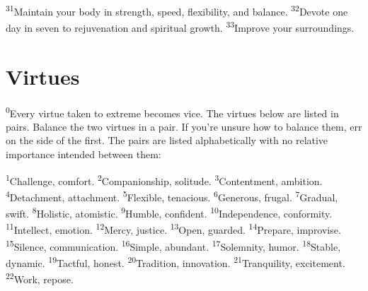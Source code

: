 \documentclass[openany,12pt,english]{book}
\newenvironment{para}{\par\pretolerance=100\tolerance=200\setlength{\emergencystretch}{0.6em}\relax}{\par}
\begin{document}
\begin{para}
    \textsuperscript{31}\thinspace{}Main\-tain your bod\-y in strength, speed, flex\-i\-bil\-i\-ty, and bal\-ance.
    \textsuperscript{32}\thinspace{}De\-vote one day in sev\-en to rejuvenation and spir\-it\-u\-al growth.
    \textsuperscript{33}\thinspace{}Im\-prove your sur\-round\-ings.
\end{para}

\section*{Virtues}
\begin{para}
    \textsuperscript{0}\thinspace{}Eve\-ry vir\-tue tak\-en to ex\-treme becomes vi\-ce. The vir\-tues be\-low are list\-ed in pairs. Bal\-ance the two vir\-tues in a pair. If you're un\-sure how to bal\-ance them, err on the side of the first. The pairs are list\-ed al\-pha\-bet\-i\-cal\-ly with no rel\-a\-tive im\-por\-tance in\-tend\-ed be\-tween them:
\end{para}

\begin{para}
    \textsuperscript{1}\thinspace{}Chal\-lenge, com\-fort.
    \textsuperscript{2}\thinspace{}Com\-pan\-ion\-ship, sol\-i\-tude.
    \textsuperscript{3}\thinspace{}Con\-tent\-ment, am\-bi\-tion.
    \textsuperscript{4}\thinspace{}De\-tach\-ment, at\-tach\-ment.
    \textsuperscript{5}\thinspace{}Flex\-i\-ble, te\-na\-cious.
    \textsuperscript{6}\thinspace{}Gen\-er\-ous, fru\-gal.
    \textsuperscript{7}\thinspace{}Grad\-u\-al, swift.
    \textsuperscript{8}\thinspace{}Ho\-lis\-tic, at\-om\-is\-tic.
    \textsuperscript{9}\thinspace{}Hum\-ble, con\-fi\-dent.
    \textsuperscript{10}\thinspace{}In\-de\-pend\-ence, con\-form\-i\-ty.
    \textsuperscript{11}\thinspace{}In\-tel\-lect, e\-mo\-tion.
    \textsuperscript{12}\thinspace{}Mer\-cy, jus\-tice.
    \textsuperscript{13}\thinspace{}O\-pen, guard\-ed.
    \textsuperscript{14}\thinspace{}Pre\-pare, im\-pro\-vise.
    \textsuperscript{15}\thinspace{}Si\-lence, com\-mu\-ni\-ca\-tion.
    \textsuperscript{16}\thinspace{}Sim\-ple, a\-bun\-dant.
    \textsuperscript{17}\thinspace{}So\-lem\-ni\-ty, hu\-mor.
    \textsuperscript{18}\thinspace{}Sta\-ble, dy\-nam\-ic.
    \textsuperscript{19}\thinspace{}Tact\-ful, hon\-est.
    \textsuperscript{20}\thinspace{}Tra\-di\-tion, in\-no\-va\-tion.
    \textsuperscript{21}\thinspace{}Tran\-quil\-i\-ty, ex\-cite\-ment.
    \textsuperscript{22}\thinspace{}Work, re\-pose.
\end{para}
\end{document}

